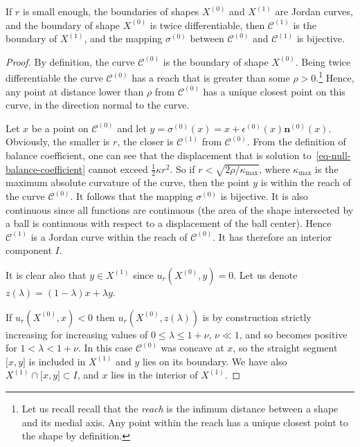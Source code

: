 \documentclass[review]{siamart220329}
\newcommand{\C}{\mathcal{C}} %
\begin{document}
\begin{proposition} \label{prop-C-equ-X}
  If $r$ is small enough, the boundaries of shapes $X^{(0)}$ and
  $X^{(1)}$ are Jordan curves, and the boundary of shape $X^{(0)}$ is
  twice differentiable, then $\C^{(1)}$ is the boundary of $X^{(1)}$,
  and the mapping $\sigma^{(0)}$ between $\C^{(0)}$ and $\C^{(1)}$ is
  bijective.
\end{proposition}
\begin{proof}
  By definition, the curve $\C^{(0)}$ is the boundary of shape
  $X^{(0)}$.  Being twice differentiable the curve $\C^{(0)}$ has a
  reach that is greater than some $\rho > 0$.\footnote{Let us recall
  recall that the {\em reach} is the infimum distance between a shape
  and its medial axis. Any point within the reach has a unique closest
  point to the shape by definition.} Hence, any point at distance lower than $\rho$
  from $\C^{(0)}$ has a unique closest point on this curve, in the
  direction normal to the curve.

  Let $x$ be a point on $\C^{(0)}$ and let
  $y=\sigma^{(0)}(x)=x+\epsilon^{(0)}(x) \mathbf{n}^{(0)}(x)$.
  Obviously, the smaller is $r$, the closer is $\C^{(1)}$ from
  $\C^{(0)}$.  From the definition of balance coefficient, one can see
  that the displacement that is solution to~\cref{eq-null-balance-coefficient} cannot exceed $\frac{1}{2}\kappa
  r^2$. So if $r < \sqrt{2\rho / \kappa_{\max}}$, where
  $\kappa_{\max}$ is the maximum absolute curvature of the curve, then
  the point $y$ is within the reach of the curve $\C^{(0)}$. It follows
  that the mapping $\sigma^{(0)}$ is bijective. It is also continuous
  since all functions are continuous (the area of the shape
  intersected by a ball is continuous with respect to a displacement
  of the ball center).  Hence $\C^{(1)}$ is a Jordan curve within the
  reach of $\C^{(0)}$. It has therefore an interior component $I$.

  It is clear also that $y \in X^{(1)}$ since $u_r(X^{(0)},y)=0$.
  Let us denote $z(\lambda)=(1-\lambda)x+\lambda y$.

  If $u_r(X^{(0)},x)<0$ then $u_r(X^{(0)},z(\lambda))$ is by
  construction strictly increasing for increasing values of $0 \le
  \lambda \le 1+\nu$, $\nu \ll 1$, and so becomes positive for
  $1<\lambda < 1 + \nu$. In this case $\C^{(0)}$ was concave at $x$,
  so the straight segment $\lbrack x,y \rbrack$ is included in
  $X^{(1)}$ and $y$ lies on its boundary. We have also $X^{(1)}
  \cap \lbrack x,y \rbrack \subset I$, and $x$ lies in the interior of
  $X^{(1)}$.
  

\end{proof}
\end{document}
